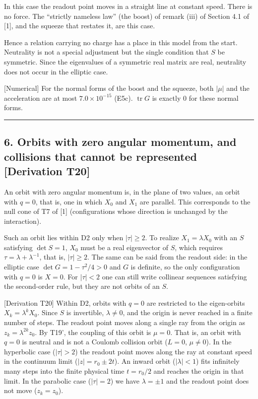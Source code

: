 \documentclass[
  a4paper,
]{article}
\begin{document}
In this case the readout point moves in a straight line at constant
speed. There is no force. The ``strictly nameless law'' (the boost) of
remark (iii) of Section 4.1 of {[}1{]}, and the squeeze that restates
it, are this case.

Hence a relation carrying no charge has a place in this model from the
start. Neutrality is not a special adjustment but the single condition
that \(S\) be symmetric. Since the eigenvalues of a symmetric real
matrix are real, neutrality does not occur in the elliptic case.

{[}Numerical{]} For the normal forms of the boost and the squeeze, both
\(\lvert\mu\rvert\) and the acceleration are at most
\(7.0\times10^{-15}\) (E5c). \(\operatorname{tr}G\) is exactly 0 for
these normal forms.

\begin{center}\rule{0.5\linewidth}{0.5pt}\end{center}

\subsection{6. Orbits with zero angular momentum, and collisions that
cannot be represented {[}Derivation
T20{]}}\label{orbits-with-zero-angular-momentum-and-collisions-that-cannot-be-represented-derivation-t20}

An orbit with zero angular momentum is, in the plane of two values, an
orbit with \(q=0\), that is, one in which \(X_0\) and \(X_1\) are
parallel. This corresponds to the null cone of T7 of {[}1{]}
(configurations whose direction is unchanged by the interaction).

Such an orbit lies within D2 only when \(\lvert\tau\rvert\ge2\). To
realize \(X_1=\lambda X_0\) with an \(S\) satisfying \(\det S=1\),
\(X_0\) must be a real eigenvector of \(S\), which requires
\(\tau=\lambda+\lambda^{-1}\), that is, \(\lvert\tau\rvert\ge2\). The
same can be said from the readout side: in the elliptic case
\(\det G=1-\tau^2/4>0\) and \(G\) is definite, so the only configuration
with \(q=0\) is \(X=0\). For \(\lvert\tau\rvert<2\) one can still write
collinear sequences satisfying the second-order rule, but they are not
orbits of an \(S\).

{[}Derivation T20{]} Within D2, orbits with \(q=0\) are restricted to
the eigen-orbits \(X_k=\lambda^kX_0\). Since \(S\) is invertible,
\(\lambda\neq0\), and the origin is never reached in a finite number of
steps. The readout point moves along a single ray from the origin as
\(z_k=\lambda^{2k}z_0\). By T19', the coupling of this orbit is
\(\mu=0\). That is, an orbit with \(q=0\) is neutral and is not a
Coulomb collision orbit (\(L=0\), \(\mu\neq0\)). In the hyperbolic case
(\(\lvert\tau\rvert>2\)) the readout point moves along the ray at
constant speed in the continuum limit (\(\lvert z\rvert=r_0\pm2t\)). An
inward orbit (\(\lvert\lambda\rvert<1\)) fits infinitely many steps into
the finite physical time \(t=r_0/2\) and reaches the origin in that
limit. In the parabolic case (\(\lvert\tau\rvert=2\)) we have
\(\lambda=\pm1\) and the readout point does not move (\(z_k=z_0\)).
\end{document}
